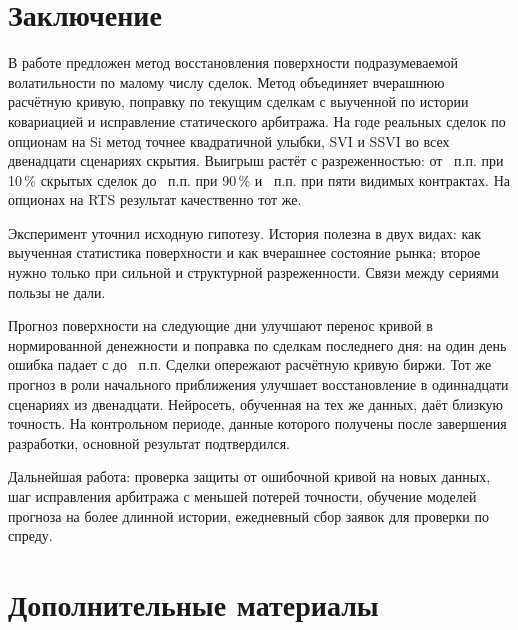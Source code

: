 \documentclass{article}
\begin{document}
\section{Заключение}\label{sec:concl}

В работе предложен метод восстановления поверхности подразумеваемой волатильности по малому числу сделок. Метод объединяет вчерашнюю расчётную кривую, поправку по текущим сделкам с выученной по истории ковариацией и исправление статического арбитража. На годе реальных сделок по опционам на Si метод точнее квадратичной улыбки, SVI и SSVI во всех двенадцати сценариях скрытия. Выигрыш растёт с разреженностью: от ~п.п. при 10\,\% скрытых сделок до ~п.п. при 90\,\% и ~п.п. при пяти видимых контрактах. На опционах на RTS результат качественно тот же.

Эксперимент уточнил исходную гипотезу. История полезна в двух видах: как выученная статистика поверхности и как вчерашнее состояние рынка; второе нужно только при сильной и структурной разреженности. Связи между сериями пользы не дали.

Прогноз поверхности на следующие дни улучшают перенос кривой в нормированной денежности и поправка по сделкам последнего дня: на один день ошибка падает с  до ~п.п. Сделки опережают расчётную кривую биржи. Тот же прогноз в роли начального приближения улучшает восстановление в одиннадцати сценариях из двенадцати. Нейросеть, обученная на тех же данных, даёт близкую точность. На контрольном периоде, данные которого получены после завершения разработки, основной результат подтвердился.

Дальнейшая работа: проверка защиты от ошибочной кривой на новых данных, шаг исправления арбитража с меньшей потерей точности, обучение моделей прогноза на более длинной истории, ежедневный сбор заявок для проверки по спреду.






\newpage
\appendix
\section{Дополнительные материалы}\label{app}
\end{document}
